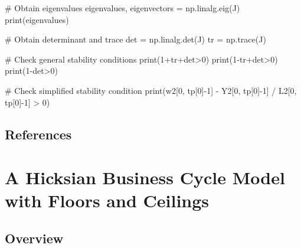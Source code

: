 \documentclass[
  letterpaper,
  DIV=11,
  numbers=noendperiod]{scrreprt}
\newenvironment{Shaded}{\begin{snugshade}}{\end{snugshade}}
\newcommand{\BuiltInTok}[1]{\textcolor[rgb]{0.00,0.23,0.31}{#1}}
\newcommand{\CommentTok}[1]{\textcolor[rgb]{0.37,0.37,0.37}{#1}}
\newcommand{\DecValTok}[1]{\textcolor[rgb]{0.68,0.00,0.00}{#1}}
\newcommand{\NormalTok}[1]{\textcolor[rgb]{0.00,0.23,0.31}{#1}}
\newcommand{\OperatorTok}[1]{\textcolor[rgb]{0.37,0.37,0.37}{#1}}
\begin{document}
\begin{tcolorbox}
\begin{Shaded}
\begin{Highlighting}[]
\CommentTok{\# Obtain eigenvalues}
\NormalTok{eigenvalues, eigenvectors }\OperatorTok{=}\NormalTok{ np.linalg.eig(J)}
\BuiltInTok{print}\NormalTok{(eigenvalues)}

\CommentTok{\# Obtain determinant and trace}
\NormalTok{det }\OperatorTok{=}\NormalTok{ np.linalg.det(J)}
\NormalTok{tr }\OperatorTok{=}\NormalTok{ np.trace(J)}

\CommentTok{\# Check general stability conditions}
\BuiltInTok{print}\NormalTok{(}\DecValTok{1}\OperatorTok{+}\NormalTok{tr}\OperatorTok{+}\NormalTok{det}\OperatorTok{\textgreater{}}\DecValTok{0}\NormalTok{)}
\BuiltInTok{print}\NormalTok{(}\DecValTok{1}\OperatorTok{{-}}\NormalTok{tr}\OperatorTok{+}\NormalTok{det}\OperatorTok{\textgreater{}}\DecValTok{0}\NormalTok{)}
\BuiltInTok{print}\NormalTok{(}\DecValTok{1}\OperatorTok{{-}}\NormalTok{det}\OperatorTok{\textgreater{}}\DecValTok{0}\NormalTok{)}

\CommentTok{\# Check simplified stability condition}
\BuiltInTok{print}\NormalTok{(w2[}\DecValTok{0}\NormalTok{, tp[}\DecValTok{0}\NormalTok{]}\OperatorTok{{-}}\DecValTok{1}\NormalTok{] }\OperatorTok{{-}}\NormalTok{ Y2[}\DecValTok{0}\NormalTok{, tp[}\DecValTok{0}\NormalTok{]}\OperatorTok{{-}}\DecValTok{1}\NormalTok{] }\OperatorTok{/}\NormalTok{ L2[}\DecValTok{0}\NormalTok{, tp[}\DecValTok{0}\NormalTok{]}\OperatorTok{{-}}\DecValTok{1}\NormalTok{] }\OperatorTok{\textgreater{}} \DecValTok{0}\NormalTok{)}
\end{Highlighting}
\end{Shaded}

\end{tcolorbox}

\section{References}\label{references-14}

\chapter{A Hicksian Business Cycle Model with Floors and
Ceilings}\label{sec-hicks}

\section{Overview}\label{overview-12}
\end{document}
